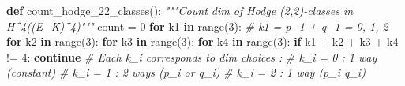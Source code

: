 \documentclass[
  11pt,
  a4paper,
]{amsart}
\newenvironment{Shaded}{}{}
\newcommand{\BuiltInTok}[1]{\textcolor[rgb]{0.00,0.50,0.00}{#1}}
\newcommand{\CommentTok}[1]{\textcolor[rgb]{0.38,0.63,0.69}{\textit{#1}}}
\newcommand{\ControlFlowTok}[1]{\textcolor[rgb]{0.00,0.44,0.13}{\textbf{#1}}}
\newcommand{\DecValTok}[1]{\textcolor[rgb]{0.25,0.63,0.44}{#1}}
\newcommand{\KeywordTok}[1]{\textcolor[rgb]{0.00,0.44,0.13}{\textbf{#1}}}
\newcommand{\NormalTok}[1]{#1}
\newcommand{\OperatorTok}[1]{\textcolor[rgb]{0.40,0.40,0.40}{#1}}
\begin{document}
\begin{Shaded}
\begin{Highlighting}[]
\KeywordTok{def}\NormalTok{ count\_hodge\_22\_classes():}
    \CommentTok{"""Count dim of Hodge (2,2){-}classes in H\^{}4((E\_K)\^{}4)"""}
\NormalTok{    count }\OperatorTok{=} \DecValTok{0}
    \ControlFlowTok{for}\NormalTok{ k1 }\KeywordTok{in} \BuiltInTok{range}\NormalTok{(}\DecValTok{3}\NormalTok{):  }\CommentTok{\# k1 = p\_1 + q\_1 = 0, 1, 2}
        \ControlFlowTok{for}\NormalTok{ k2 }\KeywordTok{in} \BuiltInTok{range}\NormalTok{(}\DecValTok{3}\NormalTok{):}
            \ControlFlowTok{for}\NormalTok{ k3 }\KeywordTok{in} \BuiltInTok{range}\NormalTok{(}\DecValTok{3}\NormalTok{):}
                \ControlFlowTok{for}\NormalTok{ k4 }\KeywordTok{in} \BuiltInTok{range}\NormalTok{(}\DecValTok{3}\NormalTok{):}
                    \ControlFlowTok{if}\NormalTok{ k1 }\OperatorTok{+}\NormalTok{ k2 }\OperatorTok{+}\NormalTok{ k3 }\OperatorTok{+}\NormalTok{ k4 }\OperatorTok{!=} \DecValTok{4}\NormalTok{:}
                        \ControlFlowTok{continue}
                    \CommentTok{\# Each k\_i corresponds to dim choices :}
                    \CommentTok{\# k\_i = 0 : 1 way (constant)}
                    \CommentTok{\# k\_i = 1 : 2 ways (p\_i or q\_i)}
                    \CommentTok{\# k\_i = 2 : 1 way (p\_i q\_i)}
                    

\end{Highlighting}
\end{Shaded}
\end{document}
